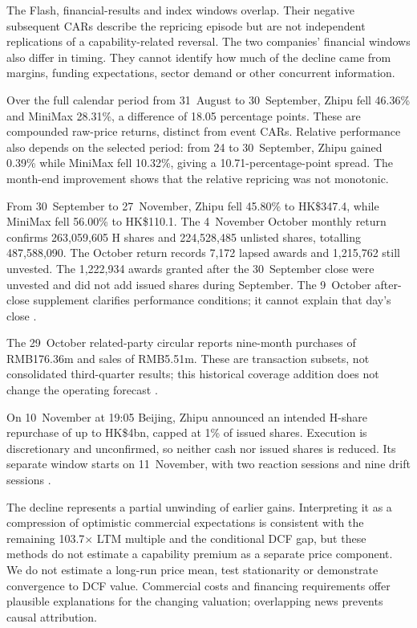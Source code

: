 \documentclass[11pt]{article}
\begin{document}
The Flash, financial-results and index windows overlap. Their negative subsequent CARs describe the repricing episode but are not independent replications of a capability-related reversal. The two companies' financial windows also differ in timing. They cannot identify how much of the decline came from margins, funding expectations, sector demand or other concurrent information.

Over the full calendar period from 31~August to 30~September, Zhipu fell 46.36\% and MiniMax 28.31\%, a difference of 18.05 percentage points. These are compounded raw-price returns, distinct from event CARs. Relative performance also depends on the selected period: from 24 to 30~September, Zhipu gained 0.39\% while MiniMax fell 10.32\%, giving a 10.71-percentage-point spread. The month-end improvement shows that the relative repricing was not monotonic.

From 30~September to 27~November, Zhipu fell 45.80\% to HK\$347.4, while MiniMax fell 56.00\% to HK\$110.1. The 4~November October monthly return confirms 263,059,605 H shares and 224,528,485 unlisted shares, totalling 487,588,090. The October return records 7,172 lapsed awards and 1,215,762 still unvested. The 1,222,934 awards granted after the 30~September close were unvested and did not add issued shares during September. The 9~October after-close supplement clarifies performance conditions; it cannot explain that day's close \citep{zhipuoctmonthly2026,zhipuawards2026}.

The 29~October related-party circular reports nine-month purchases of RMB176.36m and sales of RMB5.51m. These are transaction subsets, not consolidated third-quarter results; this historical coverage addition does not change the operating forecast \citep{zhipucircular2026}.

On 10~November at 19:05 Beijing, Zhipu announced an intended H-share repurchase of up to HK\$4bn, capped at 1\% of issued shares. Execution is discretionary and unconfirmed, so neither cash nor issued shares is reduced. Its separate window starts on 11~November, with two reaction sessions and nine drift sessions \citep{zhipubuyback2026}.

The decline represents a partial unwinding of earlier gains. Interpreting it as a compression of optimistic commercial expectations is consistent with the remaining 103.7$\times$ LTM multiple and the conditional DCF gap, but these methods do not estimate a capability premium as a separate price component. We do not estimate a long-run price mean, test stationarity or demonstrate convergence to DCF value. Commercial costs and financing requirements offer plausible explanations for the changing valuation; overlapping news prevents causal attribution.
\end{document}
